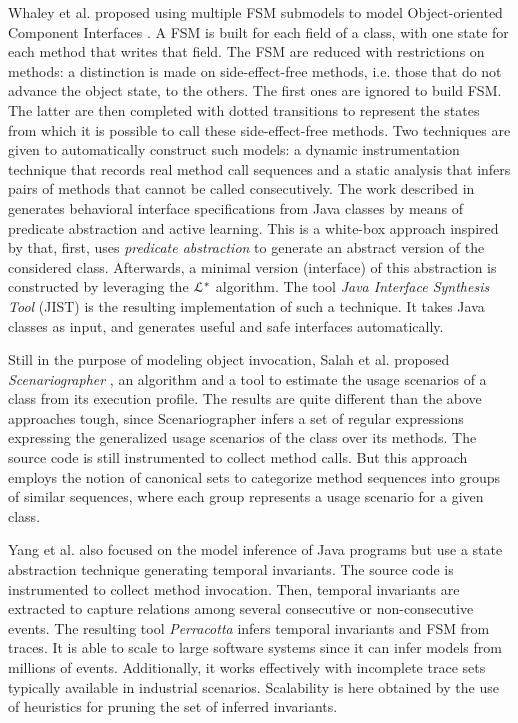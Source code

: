Whaley et al. proposed using multiple FSM submodels to model Object-oriented Component Interfaces \cite{Whaley:2002:AEO:566171.566212}. A FSM is built for each field of a class, with one state for each method that writes that field. The FSM are reduced with restrictions on methods: a distinction is made on side-effect-free methods, i.e. those that do not advance the object state, to the others. The first ones are ignored to build FSM. The latter are then completed with dotted transitions to represent the states from which it is possible to call these side-effect-free methods. Two
techniques are given to automatically construct such models: a
dynamic instrumentation technique that records real method call sequences and a static analysis that
infers pairs of methods that cannot be called consecutively. The work described in \cite{Alur:2005:SIS:1047659.1040314}
generates behavioral interface specifications from Java classes by
means of predicate abstraction and active learning. This is a
white-box approach inspired by
\cite{Whaley:2002:AEO:566171.566212} that, first, uses \textit{predicate abstraction} to generate an abstract version of the considered
class. Afterwards, a minimal version (interface) of this
abstraction is constructed by leveraging the $\EuScript{L}^*$
algorithm. The tool \textit{Java Interface Synthesis Tool} (JIST)
is the resulting implementation of such a technique. It takes
Java classes as input, and generates useful and safe interfaces
automatically.


Still in the purpose of modeling object invocation, Salah et al. proposed \textit{Scenariographer}
\cite{Salah05scenariographer}, an algorithm and a tool to
estimate the usage scenarios of a class from its execution
profile. The results are quite different than the above approaches tough, since Scenariographer infers a set of regular expressions expressing the generalized usage scenarios of the class over its methods. The source code is still instrumented to collect method calls. But this approach employs the notion of canonical sets to categorize method sequences into groups of similar sequences,
where each group represents a usage scenario for a given class.%

Yang et al. \cite{Yang:2006:PMT:1134285.1134325} also  focused on the model inference of Java programs but use a state abstraction technique generating temporal invariants. The source code is instrumented to collect method invocation. Then, temporal invariants are extracted to capture relations among several consecutive or non-consecutive events. The resulting tool \textit{Perracotta} infers temporal invariants and FSM from traces. It is able to scale to large software systems since it can infer models from millions of events. Additionally, it works
effectively with incomplete trace sets typically available in
industrial scenarios. Scalability is here obtained by the use of heuristics   for
pruning the set of inferred invariants.

